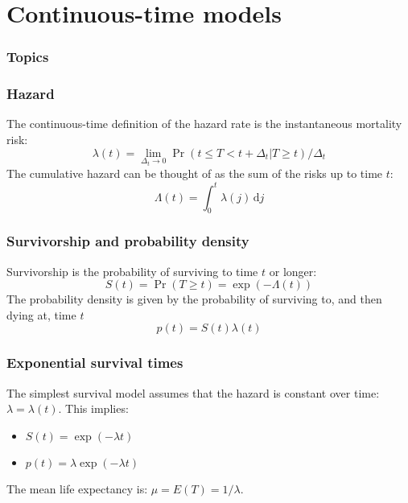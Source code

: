 \documentclass[color=usenames,dvipsnames]{beamer}\usepackage[]{graphicx}\usepackage[]{color}
\begin{document}
\section{Continuous-time models}



\begin{frame}[plain]
  \frametitle{Topics}
  \Large
  \tableofcontents[currentsection]
\end{frame}


\begin{frame}
  \frametitle{Hazard}
  The continuous-time definition of the hazard rate is the
  instantaneous mortality risk:
  \[
    \lambda(t) = \lim_{\Delta_t \to 0} \Pr(t \le T < t+\Delta_t | T\ge t)/\Delta_t
  \]
  \pause
  \vfill
  The cumulative hazard can be thought of as the sum of the risks up
  to time $t$:
  \[
    \Lambda(t) = \int_{0}^t \lambda(j) \,\mathrm{d}j
  \]
\end{frame}


\begin{frame}
  \frametitle{Survivorship and probability density}
  Survivorship is the probability of surviving to time $t$ or longer:
  \[
    S(t) = \Pr(T \ge t) = \exp(-\Lambda(t))
    \]
  \pause
  \vfill
  The probability density is given by the probability of surviving to,
  and then dying at, time $t$
  \[
    p(t) = S(t)\lambda(t) %
  \]
\end{frame}



\begin{frame}
  \frametitle{Exponential survival times}
  The simplest survival model assumes that the hazard is constant over
  time: $\lambda = \lambda(t)$.
  \pause
  \vfill
  This implies:
  \begin{itemize}
    \item $S(t) = \exp(-\lambda t)$
    \item $p(t) = \lambda \exp(-\lambda t)$
  \end{itemize}
  \pause
  \vfill
  The mean life expectancy is: $\mu = E(T) = 1/\lambda$. 
\end{frame}
\end{document}
